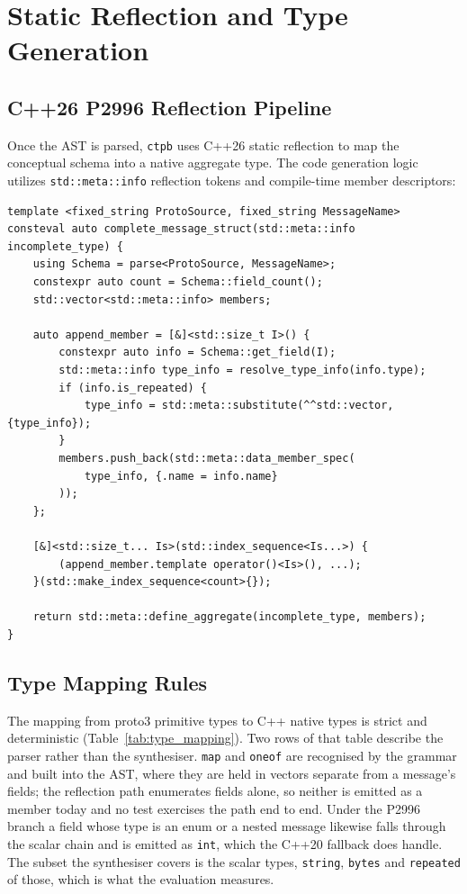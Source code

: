 \section{Static Reflection and Type Generation}

\subsection{C++26 P2996 Reflection Pipeline}
Once the AST is parsed, \texttt{ctpb} uses C++26 static reflection to map the conceptual schema into a native aggregate type. The code generation logic utilizes \texttt{std::meta::info} reflection tokens and compile-time member descriptors:

\begin{lstlisting}[language=ModernC++, caption={Programmatic Struct Member Injection}]
template <fixed_string ProtoSource, fixed_string MessageName>
consteval auto complete_message_struct(std::meta::info incomplete_type) {
    using Schema = parse<ProtoSource, MessageName>;
    constexpr auto count = Schema::field_count();
    std::vector<std::meta::info> members;

    auto append_member = [&]<std::size_t I>() {
        constexpr auto info = Schema::get_field(I);
        std::meta::info type_info = resolve_type_info(info.type);
        if (info.is_repeated) {
            type_info = std::meta::substitute(^^std::vector, {type_info});
        }
        members.push_back(std::meta::data_member_spec(
            type_info, {.name = info.name}
        ));
    };

    [&]<std::size_t... Is>(std::index_sequence<Is...>) {
        (append_member.template operator()<Is>(), ...);
    }(std::make_index_sequence<count>{});

    return std::meta::define_aggregate(incomplete_type, members);
}
\end{lstlisting}

\subsection{Type Mapping Rules}
The mapping from proto3 primitive types to C++ native types is strict and deterministic (Table~\ref{tab:type_mapping}). Two rows of that table describe the parser rather than the synthesiser. \texttt{map} and \texttt{oneof} are recognised by the grammar and built into the AST, where they are held in vectors separate from a message's fields; the reflection path enumerates fields alone, so neither is emitted as a member today and no test exercises the path end to end. Under the P2996 branch a field whose type is an enum or a nested message likewise falls through the scalar chain and is emitted as \texttt{int}, which the C++20 fallback does handle. The subset the synthesiser covers is the scalar types, \texttt{string}, \texttt{bytes} and \texttt{repeated} of those, which is what the evaluation measures.

